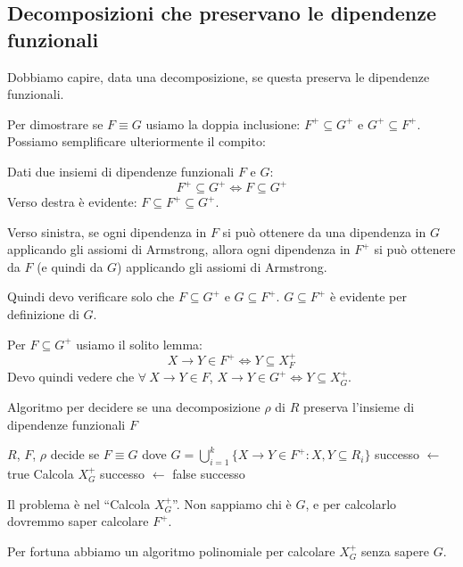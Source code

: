 \subsection{Decomposizioni che preservano le dipendenze funzionali}

Dobbiamo capire, data una decomposizione, se questa preserva le dipendenze funzionali.

Per dimostrare se $F \equiv G$ usiamo la doppia inclusione: $F^+ \subseteq G^+$ e $G^+ \subseteq F^+$. Possiamo semplificare ulteriormente il compito:
\begin{lem}
Dati due insiemi di dipendenze funzionali $F$ e $G$:
\[
F^+ \subseteq G^+ \iff F \subseteq G^+
\]
Verso destra \`e evidente: $F \subseteq F^+ \subseteq G^+$.

Verso sinistra, se ogni dipendenza in $F$ si pu\`o ottenere da una dipendenza in $G$ applicando gli assiomi di Armstrong, allora ogni dipendenza in $F^+$ si pu\`o ottenere da $F$ (e quindi da $G$) applicando gli assiomi di Armstrong.
\end{lem}
Quindi devo verificare solo che $F \subseteq G^+$ e $G \subseteq F^+$. $G \subseteq F^+$ \`e evidente per definizione di $G$.

Per $F \subseteq G^+$ usiamo il solito lemma:
\[
X \to Y \in F^+ \iff Y \subseteq X^{+}_{F}
\]
Devo quindi vedere che $\forall \ X \to Y \in F$, $X \to Y \in G^+ \iff Y \subseteq X_{G}^{+}$.

\begin{algorithm}[ht]
\caption{Algoritmo per decidere se una decomposizione $\rho$ di $R$ preserva l'insieme di dipendenze funzionali $F$}
\begin{algorithmic}
\Require $R$, $F$, $\rho$
\Ensure decide se $F \equiv G$ dove $G = \bigcup_{i = 1}^{k} \{ X \to Y \in F^+ : X, Y \subseteq R_i \}$
\State successo $\gets$ true
    \State Calcola $X_{G}^{+}$
        \State successo $\gets$ false
    \EndIf
\EndFor
\State \Return successo
\end{algorithmic}
\end{algorithm}
Il problema \`e nel ``Calcola $X_{G}^{+}$''. Non sappiamo chi \`e $G$, e per calcolarlo dovremmo saper calcolare $F^+$.

Per fortuna abbiamo un algoritmo polinomiale per calcolare $X_{G}^{+}$ senza sapere $G$.
 
